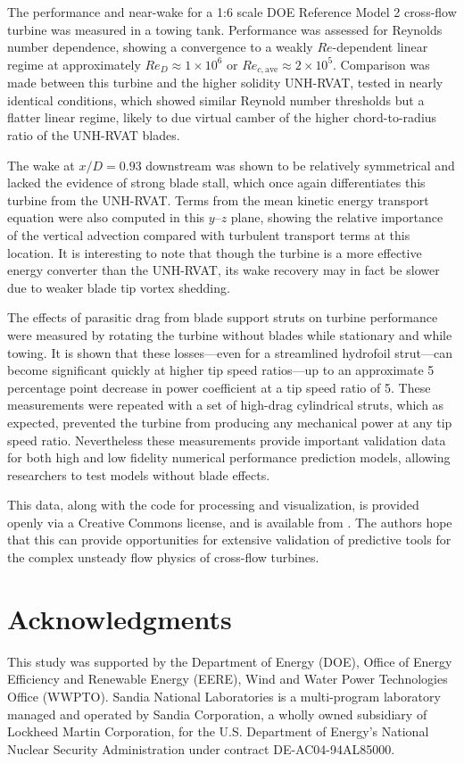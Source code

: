 \documentclass[10pt,letterpaper]{article}
\begin{document}
The performance and near-wake for a 1:6 scale DOE Reference Model 2 cross-flow
turbine was measured in a towing tank. Performance was assessed for Reynolds
number dependence, showing a convergence to a weakly $Re$-dependent linear
regime at approximately $Re_D \approx 1 \times 10^6$ or $Re_{c,\mathrm{ave}}
\approx 2 \times 10^5$. Comparison was made between this turbine and the higher
solidity UNH-RVAT, tested in nearly identical conditions, which showed similar
Reynold number thresholds but a flatter linear regime, likely to due virtual
camber of the higher chord-to-radius ratio of the UNH-RVAT blades.

The wake at $x/D=0.93$ downstream was shown to be relatively symmetrical and
lacked the evidence of strong blade stall, which once again differentiates this
turbine from the UNH-RVAT. Terms from the mean kinetic energy transport equation
were also computed in this $y$--$z$ plane, showing the relative importance of
the vertical advection compared with turbulent transport terms at this location.
It is interesting to note that though the turbine is a more effective energy
converter than the UNH-RVAT, its wake recovery may in fact be slower due to
weaker blade tip vortex shedding.

The effects of parasitic drag from blade support struts on turbine performance
were measured by rotating the turbine without blades while stationary and while
towing. It is shown that these losses---even for a streamlined hydrofoil
strut---can become significant quickly at higher tip speed ratios---up to an
approximate 5 percentage point decrease in power coefficient at a tip speed
ratio of 5. These measurements were repeated with a set of high-drag cylindrical
struts, which as expected, prevented the turbine from producing any mechanical
power at any tip speed ratio. Nevertheless these measurements provide important
validation data for both high and low fidelity numerical performance prediction
models, allowing researchers to test models without blade effects.

This data, along with the code for processing and visualization, is provided
openly via a Creative Commons license, and is available from
\cite{Bachant2015-RM2-data}. The authors hope that this can provide
opportunities for extensive validation of predictive tools for the complex
unsteady flow physics of cross-flow turbines.


\section*{Acknowledgments}

This study was supported by the Department of Energy (DOE), Office of Energy
Efficiency and Renewable Energy (EERE), Wind and Water Power Technologies Office
(WWPTO). Sandia National Laboratories is a multi-program laboratory managed and
operated by Sandia Corporation, a wholly owned subsidiary of Lockheed Martin
Corporation, for the U.S. Department of Energy's National Nuclear Security
Administration under contract DE-AC04-94AL85000.

\nolinenumbers

% 


\end{document}
